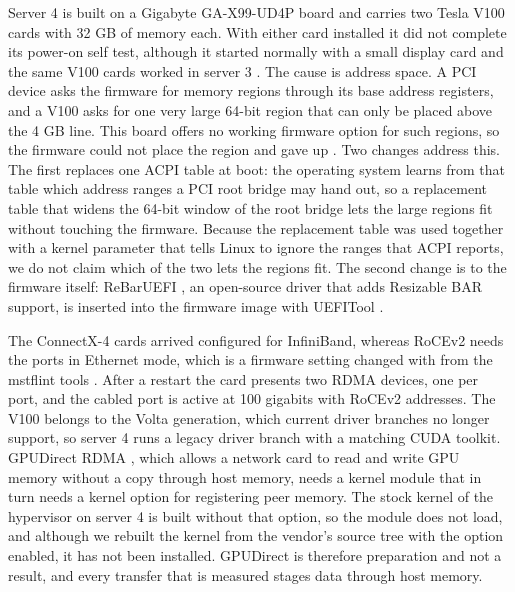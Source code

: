 Server 4 is built on a Gigabyte GA-X99-UD4P board and carries two Tesla V100
cards with 32 GB of memory each. With either card installed it did not
complete its power-on self test, although it started
normally with a small display card and the same V100 cards worked in server 3
\citep{level1techs2026}. The cause is address space. A PCI device asks the
firmware for memory regions through its base address registers, and a V100
asks for one very large 64-bit region that can only be placed above the 4 GB
line. This board offers no working firmware option for such regions, so the
firmware could not place the region and gave up \citep{x99rebar}. Two changes
address this. The first replaces one ACPI table at boot: the operating system
learns from that table which address ranges a PCI root bridge may hand out,
so a replacement table that widens the 64-bit window of the root bridge lets
the large regions fit without touching the firmware. Because the replacement
table was used together with a kernel parameter that tells Linux to ignore
the ranges that ACPI reports, we do not claim which of the two lets the
regions fit. The second change is to the firmware itself: ReBarUEFI
\citep{rebaruefi}, an open-source driver that adds Resizable BAR support, is
inserted into the firmware image with UEFITool \citep{uefitool}.

The ConnectX-4 cards arrived configured for InfiniBand, whereas RoCEv2 needs
the ports in Ethernet mode, which is a firmware setting changed with
 from the mstflint tools \citep{mstflint}. After a restart
the card presents two RDMA devices, one per port, and the cabled port is
active at 100 gigabits with RoCEv2 addresses. The V100 belongs to the Volta
generation, which current driver branches no longer support, so server 4 runs
a legacy driver branch with a matching CUDA toolkit. GPUDirect RDMA
\citep{gpudirect}, which allows a network card to read and write GPU memory
without a copy through host memory, needs a kernel module that in turn needs
a kernel option for registering peer memory. The stock kernel of the
hypervisor on server 4 is built without that option, so the module does not
load, and although we rebuilt the kernel from the vendor's source tree
\citep{pve_kernel} with the option enabled, it has not been installed.
GPUDirect is therefore preparation and not a result, and every transfer that
is measured stages data through host memory.

